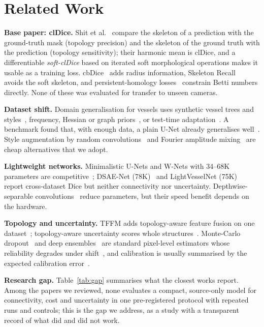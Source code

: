\documentclass[conference]{IEEEtran}
\begin{document}
\section{Related Work}
\textbf{Base paper: clDice.} Shit et al.~\cite{shit2021} compare the skeleton of a prediction with the ground-truth mask (topology precision) and the skeleton of the ground truth with the prediction (topology sensitivity); their harmonic mean is clDice, and a differentiable \emph{soft-clDice} based on iterated soft morphological operations makes it usable as a training loss. cbDice~\cite{shi2024} adds radius information, Skeleton Recall~\cite{kirchhoff2024} avoids the soft skeleton, and persistent-homology losses~\cite{hu2019} constrain Betti numbers directly. None of these was evaluated for transfer to unseen cameras.

\textbf{Dataset shift.} Domain generalisation for vessels uses synthetic vessel trees and styles~\cite{liu2026dgssa}, frequency, Hessian or graph priors~\cite{wang2026wavernet,hu2024hessian,liu2025graphseg}, or test-time adaptation~\cite{zhou2025,huang2026,khazem2026}. A benchmark found that, with enough data, a plain U-Net already generalises well~\cite{fadugba2024}. Style augmentation by random convolutions~\cite{xu2021randconv} and Fourier amplitude mixing~\cite{xu2021fourier} are cheap alternatives that we adopt.

\textbf{Lightweight networks.} Minimalistic U-Nets and W-Nets with 34--68K parameters are competitive~\cite{galdran2022}; DSAE-Net (78K)~\cite{zeng2025} and LightVesselNet (75K)~\cite{sobhan2026} report cross-dataset Dice but neither connectivity nor uncertainty. Depthwise-separable convolutions~\cite{howard2017} reduce parameters, but their speed benefit depends on the hardware.

\textbf{Topology and uncertainty.} TFFM adds topology-aware feature fusion on one dataset~\cite{ahmed2026}; topology-aware uncertainty scores whole structures~\cite{gupta2023}. Monte-Carlo dropout~\cite{gal2016} and deep ensembles~\cite{lakshminarayanan2017} are standard pixel-level estimators whose reliability degrades under shift~\cite{ovadia2019}, and calibration is usually summarised by the expected calibration error~\cite{guo2017}.

\textbf{Research gap.} Table~\ref{tab:gap} summarises what the closest works report. Among the papers we reviewed, none evaluates a compact, source-only model for connectivity, cost and uncertainty in one pre-registered protocol with repeated runs and controls; this is the gap we address, as a study with a transparent record of what did and did not work.
\end{document}
